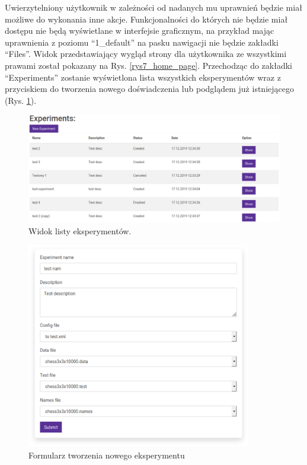 Uwierzytelniony użytkownik w zależności od nadanych mu uprawnień będzie miał możliwe do wykonania inne akcje. 
Funkcjonalności do których nie będzie miał dostępu nie będą wyświetlane w interfejsie graficznym, na przykład mając uprawnienia z poziomu \enquote{1\_default} na pasku nawigacji nie będzie zakładki \enquote{Files}. Widok przedstawiający wygląd strony dla użytkownika ze wszystkimi prawami został pokazany na Rys. \ref{rys7_home_page}. Przechodząc do zakładki \enquote{Experiments} zostanie wyświetlona lista wszystkich eksperymentów wraz z przyciskiem do tworzenia nowego doświadczenia lub podglądem już istniejącego (Rys. \ref{rys10_experiment_table}). 
\begin{figure}[htb]
	\centering
	\includegraphics[width=15cm]{grafika/experiment_table.eps}
	\caption{Widok listy eksperymentów.}
	\label{rys10_experiment_table}
\end{figure}

\begin{figure}[htb]
	\centering
	\includegraphics[height=9cm]{grafika/experiment_form.eps}
	\caption{Formularz tworzenia nowego eksperymentu}
	\label{rys11_experiment_form}
\end{figure}


